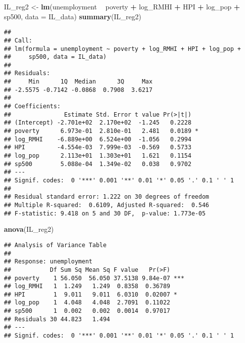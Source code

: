 \documentclass[
]{article}
\newenvironment{Shaded}{\begin{snugshade}}{\end{snugshade}}
\newcommand{\DataTypeTok}[1]{\textcolor[rgb]{0.13,0.29,0.53}{#1}}
\newcommand{\KeywordTok}[1]{\textcolor[rgb]{0.13,0.29,0.53}{\textbf{#1}}}
\newcommand{\NormalTok}[1]{#1}
\newcommand{\OperatorTok}[1]{\textcolor[rgb]{0.81,0.36,0.00}{\textbf{#1}}}
\newcommand{\StringTok}[1]{\textcolor[rgb]{0.31,0.60,0.02}{#1}}
\begin{document}
\begin{Shaded}
\begin{Highlighting}[]
\NormalTok{IL_reg2 <-}\StringTok{ }\KeywordTok{lm}\NormalTok{(unemployment }\OperatorTok{~}\StringTok{ }\NormalTok{poverty }\OperatorTok{+}\StringTok{ }\NormalTok{log_RMHI }\OperatorTok{+}\StringTok{ }\NormalTok{HPI }\OperatorTok{+}\StringTok{ }\NormalTok{log_pop }\OperatorTok{+}\StringTok{ }\NormalTok{sp500, }\DataTypeTok{data =}\NormalTok{ IL_data)}
\KeywordTok{summary}\NormalTok{(IL_reg2)}
\end{Highlighting}
\end{Shaded}

\begin{verbatim}
## 
## Call:
## lm(formula = unemployment ~ poverty + log_RMHI + HPI + log_pop + 
##     sp500, data = IL_data)
## 
## Residuals:
##     Min      1Q  Median      3Q     Max 
## -2.5575 -0.7142 -0.0868  0.7908  3.6217 
## 
## Coefficients:
##               Estimate Std. Error t value Pr(>|t|)  
## (Intercept) -2.701e+02  2.170e+02  -1.245   0.2228  
## poverty      6.973e-01  2.810e-01   2.481   0.0189 *
## log_RMHI    -6.889e+00  6.524e+00  -1.056   0.2994  
## HPI         -4.554e-03  7.999e-03  -0.569   0.5733  
## log_pop      2.113e+01  1.303e+01   1.621   0.1154  
## sp500        5.088e-04  1.349e-02   0.038   0.9702  
## ---
## Signif. codes:  0 '***' 0.001 '**' 0.01 '*' 0.05 '.' 0.1 ' ' 1
## 
## Residual standard error: 1.222 on 30 degrees of freedom
## Multiple R-squared:  0.6109, Adjusted R-squared:  0.546 
## F-statistic: 9.418 on 5 and 30 DF,  p-value: 1.773e-05
\end{verbatim}

\begin{Shaded}
\begin{Highlighting}[]
\KeywordTok{anova}\NormalTok{(IL_reg2)}
\end{Highlighting}
\end{Shaded}

\begin{verbatim}
## Analysis of Variance Table
## 
## Response: unemployment
##           Df Sum Sq Mean Sq F value   Pr(>F)    
## poverty    1 56.050  56.050 37.5138 9.84e-07 ***
## log_RMHI   1  1.249   1.249  0.8358  0.36789    
## HPI        1  9.011   9.011  6.0310  0.02007 *  
## log_pop    1  4.048   4.048  2.7091  0.11022    
## sp500      1  0.002   0.002  0.0014  0.97017    
## Residuals 30 44.823   1.494                     
## ---
## Signif. codes:  0 '***' 0.001 '**' 0.01 '*' 0.05 '.' 0.1 ' ' 1
\end{verbatim}
\end{document}
